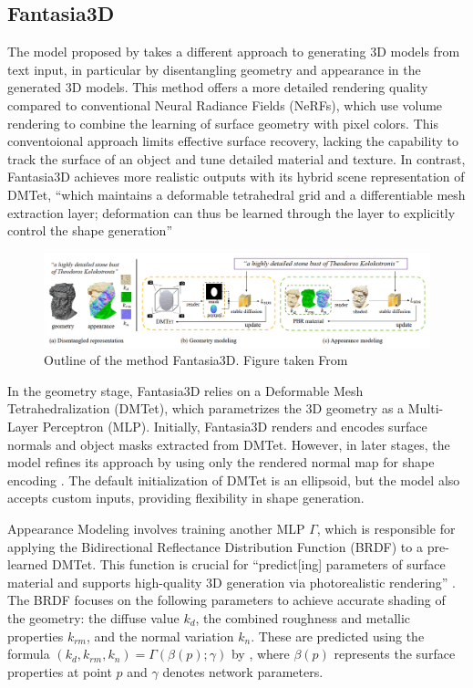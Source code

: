 \subsection{Fantasia3D}\label{fantasia3D}

The model proposed by \citeauthor{chen2023fantasia3d} takes a different approach to generating 3D models from text input, in particular by disentangling geometry and appearance in the generated 3D models.
This method offers a more detailed rendering quality compared to conventional Neural Radiance Fields (NeRFs), which use volume rendering to combine the learning of surface geometry with pixel colors. This conventoional approach limits effective surface recovery, lacking the capability to track the surface of an object and tune detailed material and texture. In contrast, Fantasia3D achieves more realistic outputs with its hybrid scene representation of DMTet, ``which maintains a deformable tetrahedral grid and a differentiable mesh extraction layer; deformation can thus be learned through the layer to explicitly control the shape generation'' \citep{chen2023fantasia3d}

\begin{figure}[ht]
  \centering
    \includegraphics[width=1\columnwidth]{figures/Fantasia3D.png}
    \caption{Outline of the method Fantasia3D. Figure taken From \citep{chen2023fantasia3d}}\label{fig:figureFantasia}
\end{figure}

In the geometry stage, Fantasia3D relies on a Deformable Mesh Tetrahedralization (DMTet), which parametrizes the 3D geometry as a Multi-Layer Perceptron (MLP). Initially, Fantasia3D renders and encodes surface normals and object masks extracted from DMTet. However, in later stages, the model refines its approach by using only the rendered normal map for shape encoding \citep{chen2023fantasia3d}. The default initialization of DMTet is an ellipsoid, but the model also accepts custom inputs, providing flexibility in shape generation.

Appearance Modeling involves training another MLP \( \Gamma \), which is responsible for applying the Bidirectional Reflectance Distribution Function (BRDF) to a pre-learned DMTet. This function is crucial for ``predict[ing] parameters of surface material and supports high-quality 3D generation via photorealistic rendering'' \citep{chen2023fantasia3d}. The BRDF focuses on the following parameters to achieve accurate shading of the geometry: the diffuse value \(k_d\), the combined roughness and metallic properties \(k_{rm}\), and the normal variation \(k_n\). These are predicted using the formula \((k_d, k_{rm}, k_n) = \Gamma(\beta(p); \gamma)\) by \citeauthor{chen2023fantasia3d}, where \(\beta(p)\) represents the surface properties at point \(p\) and \(\gamma\) denotes network parameters.

